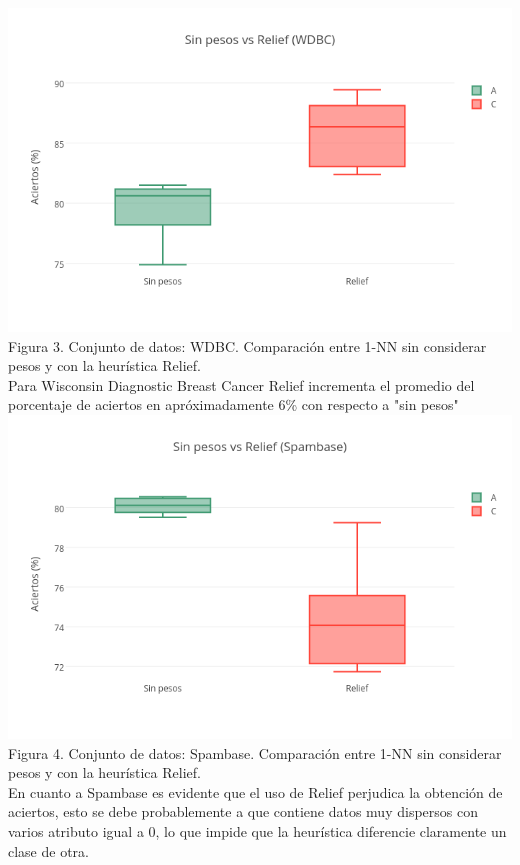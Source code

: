 \documentclass{ci5652}
\begin{document}
\includegraphics[width=\columnwidth]{no_weights-Relief_WDBC}
{\small Figura 3. Conjunto de datos: WDBC. Comparación entre 1-NN sin considerar
pesos y con la heurística Relief.}\\

Para Wisconsin Diagnostic Breast Cancer Relief incrementa el promedio del
porcentaje de aciertos en apróximadamente 6\% con respecto a "sin pesos"\\

\includegraphics[width=\columnwidth]{no_weights-Relief_Spambase}
{\small Figura 4. Conjunto de datos: Spambase. Comparación entre 1-NN sin
considerar pesos y con la heurística Relief.}\\

En cuanto a Spambase es evidente que el uso de Relief perjudica la obtención de aciertos, esto se debe probablemente a que contiene datos muy dispersos con varios atributo igual a 0, lo que impide que la heurística diferencie claramente un clase de otra.
\end{document}
